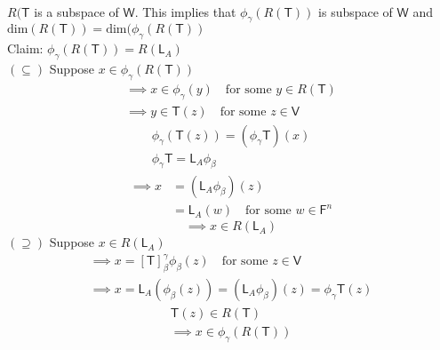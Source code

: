 \paragraph{} $R(\mathsf{T}$ is a subspace of $\mathsf{W}$. This
implies that $\phi_\gamma(R(\mathsf{T}))$ is subspace of $\mathsf{W}$
and $\text{dim}(R(\mathsf{T})) =
\text{dim}(\phi_\gamma(R(\mathsf{T}))$ 
\\Claim: $\phi_\gamma(R(\mathsf{T})) = R(\mathsf{L}_A)$
\\$(\subseteq)$ Suppose $x \in\phi_\gamma(R(\mathsf{T}))$
\begin{gather}
\implies x \in \phi_\gamma(y)\quad \text{for some } y \in
R(\mathsf{T})\\
\implies y \in \mathsf{T}(z)\quad \text{for some } z \in \mathsf{V}
\end{gather}
\begin{gather}
\phi_\gamma(\mathsf{T}(z)) = (\phi_\gamma\mathsf{T})(x)\\
\phi_\gamma\mathsf{T} = \mathsf{L}_A\phi_\beta
\end{gather}
\begin{align}
\implies x &= (\mathsf{L}_A\phi_\beta)(z)\\
&= \mathsf{L}_A(w)\quad \text{for some } w \in \mathsf{F}^n
\end{align}
\begin{equation}
\implies x \in R(\mathsf{L}_A)
\end{equation}
$(\supseteq)$ Suppose $x \in R(\mathsf{L}_A)$ 
\begin{gather}
\implies x = [\mathsf{T}]_\beta^\gamma\phi_\beta(z)\quad \text{for
  some } z \in \mathsf{V}\\
\implies x = \mathsf{L}_A(\phi_\beta(z)) = (\mathsf{L}_A\phi_\beta)(z)
= \phi_\gamma\mathsf{T}(z)
\end{gather}
\begin{gather}
\mathsf{T}(z) \in R(\mathsf{T})\\
\implies x \in \phi_\gamma(R(\mathsf{T}))
\end{gather}
